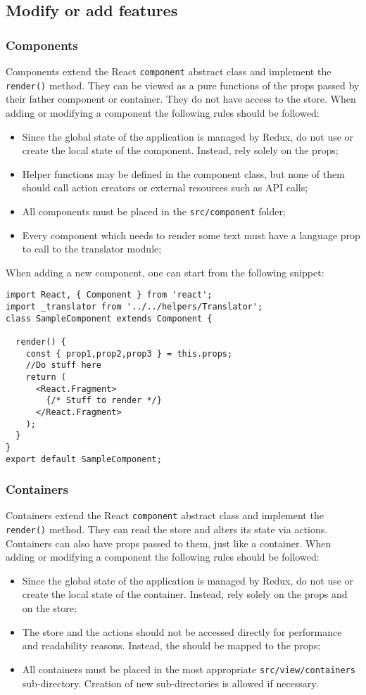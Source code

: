 \subsection{Modify or add features}
\subsubsection{Components}
Components extend the React \texttt{component} abstract class and implement the \texttt{render()} method. They can be viewed as a pure functions of the props passed by their father component or container. They do not have access to the store. When adding or modifying a component the following rules should be followed:
\begin{itemize}
	\item Since the global state of the application is managed by Redux, do not use or create the local state of the component. Instead, rely solely on the props;
	\item Helper functions may be defined in the component class, but none of them should call action creators or external resources such as API calls;
	\item All components must be placed in the \texttt{src/component} folder;
	\item Every component which needs to render some text must have a language prop to call to the translator module;
\end{itemize}
When adding a new component, one can start from the following snippet:
\begin{lstlisting}
import React, { Component } from 'react';
import _translator from '../../helpers/Translator';
class SampleComponent extends Component {

  render() {
    const { prop1,prop2,prop3 } = this.props;
    //Do stuff here
    return (
      <React.Fragment>
        {/* Stuff to render */}
      </React.Fragment>
    );
  }
}
export default SampleComponent;
\end{lstlisting}


\subsubsection{Containers}
Containers extend the React \texttt{component} abstract class and implement the \texttt{render()} method. They can read the store and alters its state via actions. Containers can also have props passed to them, just like a container. When adding or modifying a component the following rules should be followed:
\begin{itemize}
	\item Since the global state of the application is managed by Redux, do not use or create the local state of the container. Instead, rely solely on the props and on the store;
	\item The store and the actions should not be accessed directly for performance and readability reasons. Instead, the should be mapped to the props;
	\item All containers must be placed in the most appropriate \texttt{src/view/containers} sub-directory. Creation of new sub-directories is allowed if necessary.
\end{itemize}

